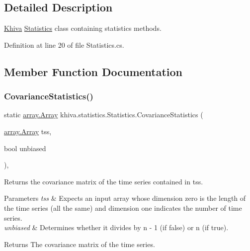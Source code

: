 \subsection{Detailed Description}
\mbox{\hyperlink{classkhiva_1_1_khiva}{Khiva}} \mbox{\hyperlink{classkhiva_1_1statistics_1_1_statistics}{Statistics}} class containing statistics methods. 



Definition at line 20 of file Statistics.\+cs.



\subsection{Member Function Documentation}
\mbox{\label{classkhiva_1_1statistics_1_1_statistics_ab05455d82ea2d082ac4bc80810fce5fa}} 
\subsubsection{\texorpdfstring{Covariance\+Statistics()}{CovarianceStatistics()}}
{\footnotesize\ttfamily static \mbox{\hyperlink{classkhiva_1_1array_1_1_array}{array.\+Array}} khiva.\+statistics.\+Statistics.\+Covariance\+Statistics (\begin{DoxyParamCaption}\item[{\mbox{\hyperlink{classkhiva_1_1array_1_1_array}{array.\+Array}}}]{tss,  }\item[{bool}]{unbiased }\end{DoxyParamCaption})\hspace{0.3cm}{\ttfamily [inline]}, {\ttfamily [static]}}



Returns the covariance matrix of the time series contained in tss. 


\begin{DoxyParams}{Parameters}
{\em tss} & Expects an input array whose dimension zero is the length of the time series (all the same) and dimension one indicates the number of time series.\\
\hline
{\em unbiased} & Determines whether it divides by n -\/ 1 (if false) or n (if true).\\
\hline
\end{DoxyParams}
\begin{DoxyReturn}{Returns}
The covariance matrix of the time series.
\end{DoxyReturn}



